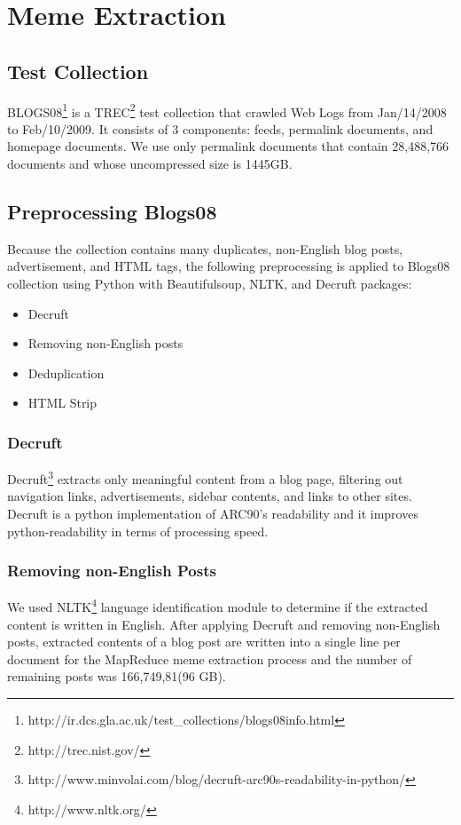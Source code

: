 \documentclass{sig-alternate}
\begin{document}
\section{Meme Extraction}

\subsection{Test Collection}

BLOGS08\footnote{http://ir.dcs.gla.ac.uk/test\_collections/blogs08info.html} is a TREC\footnote{http://trec.nist.gov/} test collection that crawled Web Logs from Jan/14/2008 to Feb/10/2009. It consists of 3 components: feeds, permalink documents, and homepage documents. We use only permalink documents that contain 28,488,766 documents and whose uncompressed size is 1445GB. 

\subsection{Preprocessing Blogs08}

Because the collection contains many duplicates, non-English blog posts, advertisement, and HTML tags, the following preprocessing is applied to Blogs08 collection using Python with Beautifulsoup, NLTK, and Decruft packages:

\begin{itemize}
\item Decruft
\item Removing non-English posts
\item Deduplication
\item HTML Strip
\end{itemize}


\subsubsection{Decruft}
Decruft\footnote{http://www.minvolai.com/blog/decruft-arc90s-readability-in-python/} extracts only meaningful content from a blog page, filtering out navigation links, advertisements, sidebar contents, and links to other sites. Decruft is a python implementation of ARC90's readability and it improves python-readability in terms of processing speed. 

\subsubsection{Removing non-English Posts}
We used NLTK\footnote{http://www.nltk.org/} language identification module to determine if the extracted content is written in English. After applying Decruft and removing non-English posts, extracted contents of a blog post are written into a single line per document for the MapReduce meme extraction process and the number of remaining posts was 166,749,81(96 GB).
\end{document}
